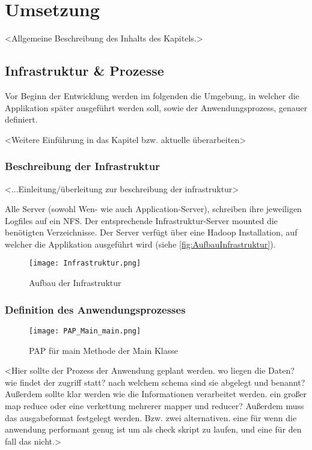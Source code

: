 
\chapter{Umsetzung}\label{cha:Umsetzung}
<Allgemeine Beschreibung des Inhalts des Kapitels.>

\section{Infrastruktur \& Prozesse}
Vor Beginn der Entwicklung werden im folgenden die Umgebung, in welcher die Applikation später ausgeführt werden soll, sowie der Anwendungsprozess, genauer definiert. 

<Weitere Einführung in das Kapitel bzw. aktuelle überarbeiten>

\subsection{Beschreibung der Infrastruktur}
<...Einleitung/überleitung zur beschreibung der infrastruktur>

Alle Server (sowohl Wen- wie auch Application-Server), schreiben ihre jeweiligen Logfiles auf ein \ac{NFS}. Der entsprechende Infrastruktur-Server mounted die benötigten Verzeichnisse. Der Server verfügt über eine Hadoop Installation, auf welcher die Applikation ausgeführt wird (siehe \autoref{fig:AufbauInfrastruktur}).

\begin{figure}
	\centering
	\texttt{[image: Infrastruktur.png]}
	\caption{Aufbau der Infrastruktur}
	\label{fig:AufbauInfrastruktur}
\end{figure}

\subsection{Definition des Anwendungsprozesses}


\begin{figure}
	\centering
	\texttt{[image: PAP\_Main\_main.png]}
	\caption{PAP für main Methode der Main Klasse}
	\label{fig:PAP_Main_main}
\end{figure}

<Hier sollte der Prozess der Anwendung geplant werden. wo liegen die Daten? wie findet der zugriff statt? nach welchem schema sind sie abgelegt und benannt? Außerdem sollte klar werden wie die Informationen verarbeitet werden. ein großer map reduce oder eine verkettung mehrerer mapper und reducer? Außerdem muss das ausgabeformat festgelegt werden. Bzw. zwei alternativen. eine für wenn die anwendung performant genug ist um als check skript zu laufen, und eine für den fall das nicht.>

